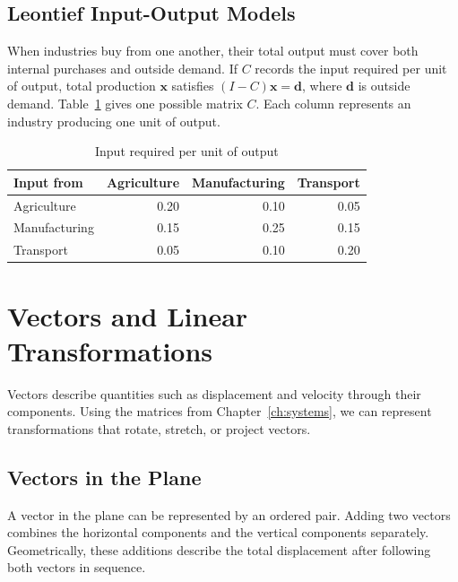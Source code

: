 \documentclass[11pt,letterpaper,oneside,openany]{textbookchapter}
\begin{document}
\section{Leontief Input-Output Models}
When industries buy from one another, their total output must cover both
internal purchases and outside demand. If \(C\) records the input required
per unit of output, total production \(\mathbf{x}\) satisfies
\((I-C)\mathbf{x}=\mathbf{d}\), where \(\mathbf{d}\) is outside demand.
Table~\ref{tab:inputs} gives one possible matrix \(C\). Each column represents
an industry producing one unit of output.

\begin{table}[htbp]
  \centering
  \caption{Input required per unit of output}
  \label{tab:inputs}
  \begin{tabular}{@{}lrrr@{}}
    \toprule
    Input from & Agriculture & Manufacturing & Transport \\
    \midrule
    Agriculture   & 0.20 & 0.10 & 0.05 \\
    Manufacturing & 0.15 & 0.25 & 0.15 \\
    Transport     & 0.05 & 0.10 & 0.20 \\
    \bottomrule
  \end{tabular}
\end{table}

\chapter{Vectors and Linear Transformations}
\chaptercontents

\begin{chapterintroduction}[Introduction]
Vectors describe quantities such as displacement and velocity through their
components. Using the matrices from Chapter~\ref{ch:systems}, we can represent
transformations that rotate, stretch, or project vectors.
\end{chapterintroduction}

\section{Vectors in the Plane}
A vector in the plane can be represented by an ordered pair. Adding two
vectors combines the horizontal components and the vertical components
separately. Geometrically, these additions describe the total displacement
after following both vectors in sequence.
\end{document}

